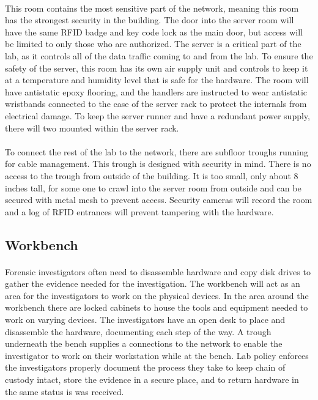 \documentclass[12pt]{article}
\begin{document}
\paragraph{}
This room contains the most sensitive part of the network, meaning this room has the strongest security in the building.
The door into the server room will have the same RFID badge and key code lock as the main door, but access will be limited to only those who are authorized.
The server is a critical part of the lab, as it controls all of the data traffic coming to and from the lab.
To ensure the safety of the server, this room has its own air supply unit and controls to keep it at a temperature and humidity level that is safe for the hardware.
The room will have antistatic epoxy flooring, and the handlers are instructed to wear antistatic wristbands connected to the case of the server rack to protect the internals from electrical damage.
To keep the server runner and have a redundant power supply, there will two mounted within the server rack.
\paragraph{}
To connect the rest of the lab to the network, there are subfloor troughs running for cable management.
This trough is designed with security in mind.
There is no access to the trough from outside of the building.
It is too small, only about 8 inches tall, for some one to crawl into the server room from outside and can be secured with metal mesh to prevent access.
Security cameras will record the room and a log of RFID entrances will prevent tampering with the hardware.
\subsection{Workbench}
\paragraph{}
Forensic investigators often need to disassemble hardware and copy disk drives to gather the evidence needed for the investigation.
The workbench will act as an area for the investigators to work on the physical devices.
In the area around the workbench there are locked cabinets to house the tools and equipment needed to work on varying devices.
The investigators have an open desk to place and disassemble the hardware, documenting each step of the way.
A trough underneath the bench supplies a connections to the network to enable the investigator to work on their workstation while at the bench.
Lab policy enforces the investigators properly document the process they take to keep chain of custody intact, store the evidence in a secure place, and to return hardware in the same status is was received.
\end{document}
